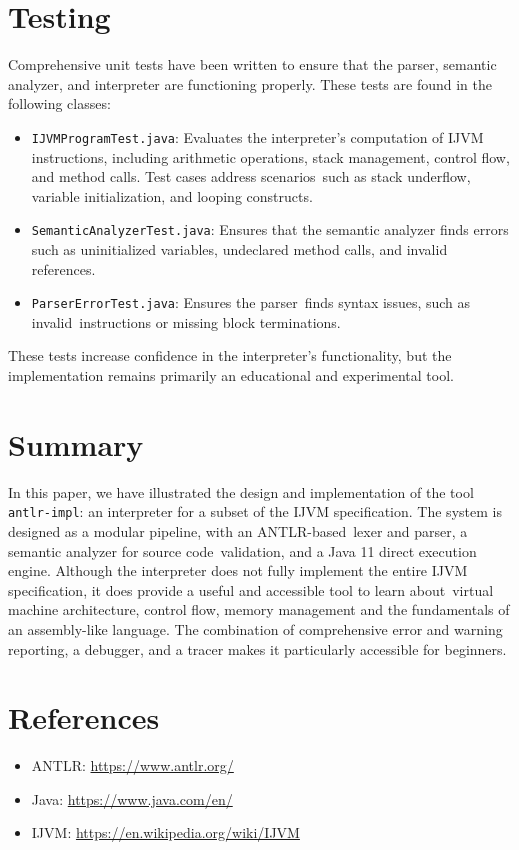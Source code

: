\documentclass[11pt]{article}
\begin{document}
\section{Testing}
Comprehensive unit tests have been written to ensure that the parser, semantic analyzer, and interpreter are functioning properly. These tests are found in the following classes:

\begin{itemize} 
	\item \texttt{IJVMProgramTest.java}: Evaluates the interpreter's computation of IJVM instructions, including arithmetic operations, stack management, control flow, and method calls. Test cases address scenarios such as stack underflow, variable initialization, and looping constructs.
     \item \texttt{SemanticAnalyzerTest.java}: Ensures that the semantic analyzer finds errors such as uninitialized variables, undeclared method calls, and invalid references.
     \item \texttt{ParserErrorTest.java}: Ensures the parser finds syntax issues, such as invalid instructions or missing block terminations.
\end{itemize}

These tests increase confidence in the interpreter's functionality, but the implementation remains primarily an educational and experimental tool.

\section{Summary}
In this paper, we have illustrated the design and implementation of the tool \texttt{antlr-impl}: an interpreter for a subset of the IJVM specification. The system is designed as a modular pipeline, with an ANTLR-based lexer and parser, a semantic analyzer for source code validation, and a Java 11 direct execution engine. Although the interpreter does not fully implement the entire IJVM specification, it does provide a useful and accessible tool to learn about virtual machine architecture, control flow, memory management and the fundamentals of an assembly-like language. The combination of comprehensive error and warning reporting, a debugger, and a tracer makes it particularly accessible for beginners.

\section*{References}
\begin{itemize}
    \item ANTLR: \url{https://www.antlr.org/}
    \item Java: \url{https://www.java.com/en/}
	\item IJVM: \url{https://en.wikipedia.org/wiki/IJVM}
\end{itemize}
\end{document}

